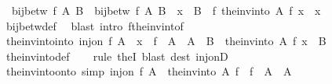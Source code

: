 \begin{isabellebody}
\ \ {\isachardoublequoteopen}bij{\isacharunderscore}{\kern0pt}betw\ f\ A\ B\ {\isasymLongrightarrow}\ {\isacharparenleft}{\kern0pt}bij{\isacharunderscore}{\kern0pt}betw\ f\ A\ B\ {\isasymLongrightarrow}\ x\ {\isasymin}\ B{\isacharparenright}{\kern0pt}\ {\isasymLongrightarrow}\ f\ {\isacharparenleft}{\kern0pt}the{\isacharunderscore}{\kern0pt}inv{\isacharunderscore}{\kern0pt}into\ A\ f\ x{\isacharparenright}{\kern0pt}\ {\isacharequal}{\kern0pt}\ x{\isachardoublequoteclose}\isanewline
%
\isadelimproof
\ \ %
\endisadelimproof
%
\isatagproof
{}\isamarkupfalse%
\ bij{\isacharunderscore}{\kern0pt}betw{\isacharunderscore}{\kern0pt}def\ \isamarkupfalse%
\ {\isacharparenleft}{\kern0pt}blast\ intro{\isacharcolon}{\kern0pt}\ f{\isacharunderscore}{\kern0pt}the{\isacharunderscore}{\kern0pt}inv{\isacharunderscore}{\kern0pt}into{\isacharunderscore}{\kern0pt}f{\isacharparenright}{\kern0pt}%
\endisatagproof
{\isafoldproof}%
%
\isadelimproof
\isanewline
%
\endisadelimproof
\isanewline
{}\isamarkupfalse%
\ the{\isacharunderscore}{\kern0pt}inv{\isacharunderscore}{\kern0pt}into{\isacharunderscore}{\kern0pt}into{\isacharcolon}{\kern0pt}\ {\isachardoublequoteopen}inj{\isacharunderscore}{\kern0pt}on\ f\ A\ {\isasymLongrightarrow}\ x\ {\isasymin}\ f\ {\isacharbackquote}{\kern0pt}\ A\ {\isasymLongrightarrow}\ A\ {\isasymsubseteq}\ B\ {\isasymLongrightarrow}\ the{\isacharunderscore}{\kern0pt}inv{\isacharunderscore}{\kern0pt}into\ A\ f\ x\ {\isasymin}\ B{\isachardoublequoteclose}\isanewline
%
\isadelimproof
\ \ %
\endisadelimproof
%
\isatagproof
{}\isamarkupfalse%
\ the{\isacharunderscore}{\kern0pt}inv{\isacharunderscore}{\kern0pt}into{\isacharunderscore}{\kern0pt}def\isanewline
\ \ \isamarkupfalse%
\ {\isacharparenleft}{\kern0pt}rule\ the{}I{}{\isacharsemicolon}{\kern0pt}\ blast\ dest{\isacharcolon}{\kern0pt}\ inj{\isacharunderscore}{\kern0pt}onD{\isacharparenright}{\kern0pt}%
\endisatagproof
{\isafoldproof}%
%
\isadelimproof
\isanewline
%
\endisadelimproof
\isanewline
{}\isamarkupfalse%
\ the{\isacharunderscore}{\kern0pt}inv{\isacharunderscore}{\kern0pt}into{\isacharunderscore}{\kern0pt}onto\ {\isacharbrackleft}{\kern0pt}simp{\isacharbrackright}{\kern0pt}{\isacharcolon}{\kern0pt}\ {\isachardoublequoteopen}inj{\isacharunderscore}{\kern0pt}on\ f\ A\ {\isasymLongrightarrow}\ the{\isacharunderscore}{\kern0pt}inv{\isacharunderscore}{\kern0pt}into\ A\ f\ {\isacharbackquote}{\kern0pt}\ {\isacharparenleft}{\kern0pt}f\ {\isacharbackquote}{\kern0pt}\ A{\isacharparenright}{\kern0pt}\ {\isacharequal}{\kern0pt}\ A{\isachardoublequoteclose}\isanewline

\end{isabellebody}
